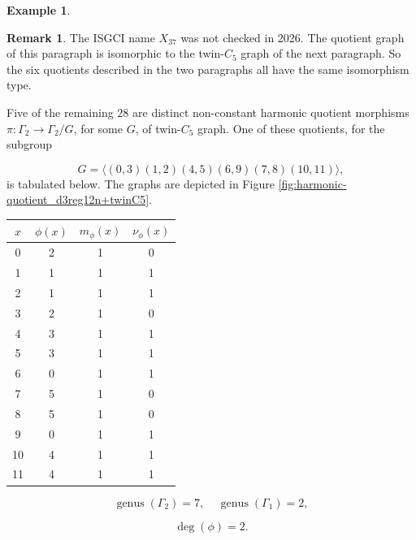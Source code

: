 \documentclass[12pt,letterpaper]{article}
\theoremstyle{definition}
\newtheorem{example}[theorem]{Example}
\newtheorem{revremark}{Remark}
\DeclareMathOperator{\genus}{genus}
\begin{document}
\begin{example}
{\begin{revremark}
\label{rem:x37}
The ISGCI name $X_{37}$ was not checked in 2026. The quotient graph of this
paragraph is isomorphic to the twin-$C_5$ graph of the next paragraph. So
the six quotients described in the two paragraphs all have the same
isomorphism type.
\end{revremark}


Five of the remaining $28$ are distinct non-constant harmonic quotient
morphisms $\pi: \Gamma_2\to \Gamma_2/G$, for some $G$, of
twin-$C_5$ graph.
One of these quotients, for the subgroup

\[
G=\langle (0,3)(1,2)(4,5)(6,9)(7,8)(10,11) \rangle,
\]
is tabulated below. The graphs are depicted in
Figure \ref{fig:harmonic-quotient_d3reg12n+twinC5}.

\begin{center}
\begin{tabular}{c|c|c|c}  
  $x$ & $\phi(x)$ & $m_\phi(x)$ & $\nu_\phi(x)$ \\ \hline
  0   &    2   &        1         &  0   \\ 
  1   &    1   &        1         &  1  \\ 
  2   &    1   &        1         &  1  \\ 
  3   &    2   &        1         &  0  \\ 
  4   &    3   &        1         &  1   \\ 
  5   &    3   &        1         &  1  \\ 
  6   &    0   &        1         &  1   \\ 
  7   &    5   &        1         &  0   \\
  8   &    5   &        1         &  0   \\
  9   &    0   &        1         &  1   \\
  10  &    4   &        1         &  1   \\
  11  &    4   &        1         &  1   \\ 
\end{tabular}
\end{center}

\[
  \genus(\Gamma_2) =7,\ \ \ \ \
  \genus(\Gamma_1) =2,
\]

\[
\deg(\phi) =2.
\]

}
\end{example}
\end{document}

